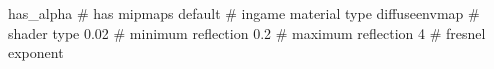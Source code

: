 has_alpha
# has mipmaps
default			 # ingame material type
diffuseenvmap            # shader type
0.02			 # minimum reflection
0.2			 # maximum reflection
4			 # fresnel exponent

